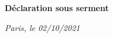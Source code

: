 
\cleardoublepage

\thispagestyle{empty}

\vspace*{\fill}

\textbf{Déclaration sous serment}


\vspace{20mm}

\noindent\textit{Paris, le 02/10/2021}
